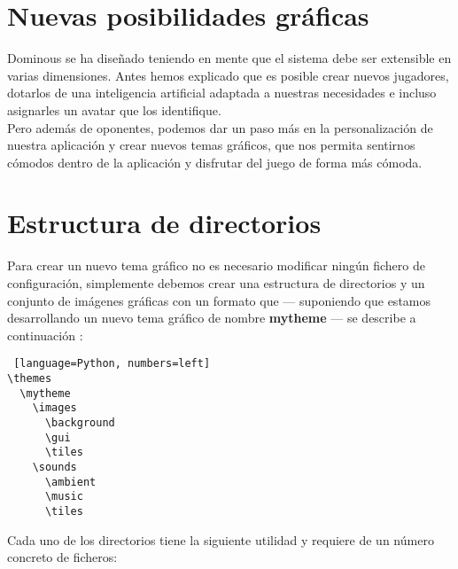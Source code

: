 


\section{Nuevas posibilidades gráficas}

Dominous se ha diseñado teniendo en mente que el sistema debe ser extensible en varias dimensiones. Antes hemos
explicado que es posible crear nuevos jugadores, dotarlos de una inteligencia artificial adaptada a nuestras necesidades
e incluso asignarles un avatar que los identifique. \\

Pero además de oponentes, podemos dar un paso más en la
personalización de nuestra aplicación y crear nuevos temas gráficos, que nos permita sentirnos cómodos dentro de la
aplicación y disfrutar del juego de forma más cómoda. \\

\section{Estructura de directorios}

Para crear un nuevo tema gráfico no es necesario modificar ningún fichero de configuración, simplemente debemos crear una
estructura de directorios y un conjunto de imágenes gráficas con un formato que --- suponiendo que estamos desarrollando
un nuevo tema gráfico de nombre \textbf{mytheme} --- se describe a continuación :

\begin{lstlisting} [language=Python, numbers=left]
\themes
  \mytheme
    \images
      \background
      \gui
      \tiles
    \sounds
      \ambient
      \music
      \tiles
\end{lstlisting}

Cada uno de los directorios tiene la siguiente utilidad y requiere de un número concreto de ficheros:

